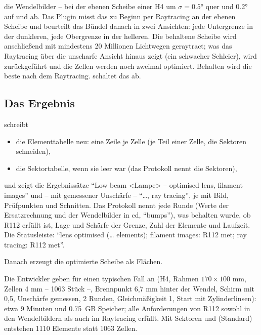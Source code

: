 \begin{description}
    die Wendelbilder -- bei der ebenen Scheibe einer H4 um $\sigma = \ang{0.5}$ quer und \ang{0.2}
    auf und ab. Das Plugin misst das zu Beginn per Raytracing an der ebenen Scheibe und beurteilt das
    Bündel danach in zwei Ansichten: jede Untergrenze in der dunkleren, jede Obergrenze in der
    helleren. Die behaltene Scheibe wird anschließend mit mindestens 20 Millionen Lichtwegen
    geraytract; was das Raytracing über die unscharfe Ansicht hinaus zeigt (ein schwacher Schleier),
    wird zurückgeführt und die Zellen werden noch zweimal optimiert. Behalten wird die beste nach dem
    Raytracing.  schaltet das ab.
\end{description}

\subsection{Das Ergebnis}

 schreibt
\begin{itemize}
  \item die Elementtabelle neu: eine Zeile je Zelle (je Teil einer Zelle, die Sektoren schneiden),
  \item die Sektortabelle, wenn sie leer war (das Protokoll nennt die Sektoren),
\end{itemize}
und zeigt die Ergebnissätze \enquote{Low beam <Lampe> – optimised lens, filament images} und -- mit
gemessener Unschärfe -- \enquote{…, ray tracing}, je mit Bild, Prüfpunkten und Schnitten. Das Protokoll
nennt jede Runde (Werte der Ersatzrechnung und der Wendelbilder in cd, \enquote{bumps}), was behalten
wurde, ob R112 erfüllt ist, Lage und Schärfe der Grenze, Zahl der Elemente und Laufzeit. Die
Statusleiste: \enquote{lens optimised (… elements); filament images: R112 met; ray tracing: R112 met}.

Danach erzeugt  die optimierte Scheibe als Flächen.

\begin{hinweis}
Die Entwickler geben für einen typischen Fall an (H4, Rahmen $170 \times 100$ mm, Zellen 4 mm --
1063 Stück --, Brennpunkt 6,7 mm hinter der Wendel, Schirm mit 0,5, Unschärfe gemessen, 2 Runden,
Gleichmäßigkeit 1, Start mit Zylinderlinsen): etwa 9 Minuten und \qty{0.75}{GB} Speicher; alle
Anforderungen von R112 sowohl in den Wendelbildern als auch im Raytracing erfüllt. Mit Sektoren und
 (Standard) entstehen 1110 Elemente statt 1063 Zellen.
\end{hinweis}

